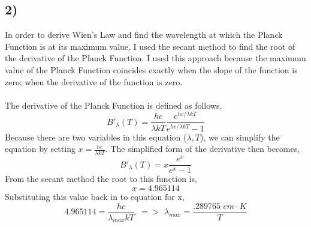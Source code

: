 \documentclass[12pt, oneside]{article}
\begin{document}
\subsection*{2)}
In order to derive Wien's Law and find the wavelength at which the Planck Function is at its maximum value, I used the secant method to find the root of the derivative of the Planck Function. I used this approach because the maximum value of the Planck Function coincides exactly when the slope of the function is zero; when the derivative of the function is zero.\\\\
The derivative of the Planck Function is defined as follows,
\[B'_{\lambda}(T) = \frac{hc}{\lambda k T}\frac{e^{hc/\lambda k T }}{e^{hc/\lambda k T } - 1}\]
Because there are two variables in this equation ($\lambda, T$), we can simplify the equation by setting $x=\frac{hc}{\lambda k T}$. The simplified form of the derivative then becomes,
\[B'_{\lambda}(T) = x\frac{e^{x}}{e^{x}-1}\]
From the secant method the root to this function is,
\[x = 4.965114\]
Substituting this value back in to equation for x,
\[4.965114 = \frac{hc}{\lambda_{max} k T}\,\,\,=>\,\, \lambda_{max} = \frac{.289765\,\,cm\cdot K}{T} \]
\end{document}
